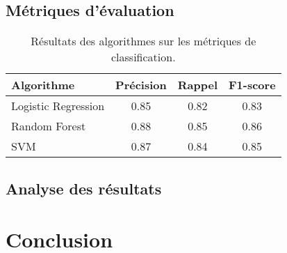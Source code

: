 \documentclass[11pt]{article}
\begin{document}
\subsection{Métriques d'évaluation}
\begin{table}[ht]
    \centering
    \begin{tabular}{|l|c|c|c|}
        \hline
        \textbf{Algorithme} & \textbf{Précision} & \textbf{Rappel} & \textbf{F1-score} \\ \hline
        Logistic Regression & 0.85               & 0.82            & 0.83              \\ \hline
        Random Forest       & 0.88               & 0.85            & 0.86              \\ \hline
        SVM                 & 0.87               & 0.84            & 0.85              \\ \hline
    \end{tabular}
    \caption{Résultats des algorithmes sur les métriques de classification.}
    \label{tab:resultats_algo}
\end{table}

\subsection{Analyse des résultats}


\section{Conclusion}



\cite{forest2009variation}
\end{document}
